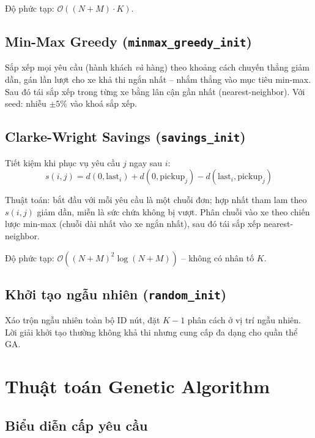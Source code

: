 \documentclass[12pt, a4paper]{article}
\begin{document}
Độ phức tạp: $\mathcal{O}((N+M) \cdot K)$.

\subsection{Min-Max Greedy (\texttt{minmax\_greedy\_init})}

Sắp xếp mọi yêu cầu (hành khách \emph{và} hàng) theo khoảng cách chuyến thẳng giảm dần, gán lần lượt cho xe khả thi ngắn nhất -- nhắm thẳng vào mục tiêu min-max. Sau đó tái sắp xếp trong từng xe bằng lân cận gần nhất (nearest-neighbor). Với seed: nhiễu $\pm 5\%$ vào khoá sắp xếp.

\subsection{Clarke-Wright Savings (\texttt{savings\_init})}

Tiết kiệm khi phục vụ yêu cầu $j$ ngay sau $i$:
\begin{equation}
  s(i, j) = d(0, \text{last}_i) + d(0, \text{pickup}_j) - d(\text{last}_i, \text{pickup}_j)
\end{equation}

Thuật toán: bắt đầu với mỗi yêu cầu là một chuỗi đơn; hợp nhất tham lam theo $s(i,j)$ giảm dần, miễn là sức chứa không bị vượt. Phân chuỗi vào xe theo chiến lược min-max (chuỗi dài nhất vào xe ngắn nhất), sau đó tái sắp xếp nearest-neighbor.

Độ phức tạp: $\mathcal{O}((N+M)^2 \log(N+M))$ -- không có nhân tố $K$.

\subsection{Khởi tạo ngẫu nhiên (\texttt{random\_init})}

Xáo trộn ngẫu nhiên toàn bộ ID nút, đặt $K-1$ phân cách ở vị trí ngẫu nhiên. Lời giải khởi tạo thường không khả thi nhưng cung cấp đa dạng cho quần thể GA.

\section{Thuật toán Genetic Algorithm}

\subsection{Biểu diễn cấp yêu cầu}
\end{document}
